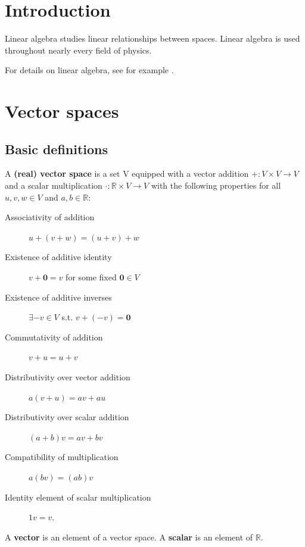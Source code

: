\documentclass{bareminimum}
\begin{document}
	
	\maketitle
	
	\section{Introduction}
	
	Linear algebra studies linear relationships between spaces. Linear algebra is used throughout nearly every field of physics.
	
	For details on linear algebra, see for example \cite{axler2024linear, roman2008linear}.
	
	
	\section{Vector spaces}
	
	
	\subsection{Basic definitions}
	
	
	\begin{defn}
		A \textbf{(real) vector space}  is a set V equipped with a vector addition $+ : V \times V \to V$ and a scalar multiplication $\cdot : \mathbb{R} \times V \to V$ with the following properties for all $u,v,w \in V$ and  $a,b \in \mathbb{R}$:
		\begin{description}
			\item[Associativity of addition] $u + (v + w) = (u + v) + w$
			\item[Existence of additive identity] $v + \mathbf{0} = v$ for some fixed $\mathbf{0} \in V$
			\item[Existence of additive inverses] $\exists -v \in V$ s.t. $v + (-v) = \mathbf{0}$
			\item[Commutativity of addition] $v + u = u + v$
			\item[Distributivity over vector addition] $a(v + u) = av + au$
			\item[Distributivity over scalar addition] $(a+b)v = av + bv$
			\item[Compatibility of multiplication] $a(bv) = (ab)v$
			\item[Identity element of scalar multiplication] $1v = v$.
		\end{description}
		A \textbf{vector} is an element of a vector space. A \textbf{scalar} is an element of $\mathbb{R}$.
	\end{defn}
	
\end{document}
